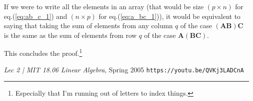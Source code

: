 \documentclass[10pt,twocolumn]{article}
\begin{document}
If we were to write all the elements in an array (that would be size $(p \times n)$ for eq.(\ref{eq:ab_c_1}) and $(n \times p)$ for eq.(\ref{eq:a_bc_1})), it would be equivalent to saying that taking the sum of elements from any column $q$ of the case $(\bm{A} \bm{B}) \bm{C}$ is the same as the sum of elements from row $q$ of the case $\bm{A} (\bm{B} \bm{C})$.

This concludes the proof.\footnote{Especially that I'm running out of letters to index things.}

\begin{thebibliography}{3}

\item \textit{Lec 2 | MIT 18.06 Linear Algebra}, Spring 2005 \verb|https://youtu.be/QVKj3LADCnA|

\end{thebibliography}
\end{document}
